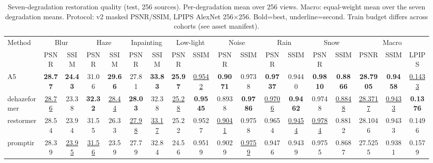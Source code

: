 \begin{table}[t]
\centering
\caption{Seven-degradation restoration quality (test, 256 sources). Per-degradation mean over 256 views. Macro: equal-weight mean over the seven degradation means. Protocol: v2 masked PSNR/SSIM, LPIPS AlexNet 256$\times$256. Bold=best, underline=second. Train budget differs across cohorts (see asset manifest).}
\begin{tabular}{lccccccccccccccccc}
\toprule
Method & \multicolumn{2}{c}{Blur} & \multicolumn{2}{c}{Haze} & \multicolumn{2}{c}{Inpainting} & \multicolumn{2}{c}{Low-light} & \multicolumn{2}{c}{Noise} & \multicolumn{2}{c}{Rain} & \multicolumn{2}{c}{Snow} & \multicolumn{3}{c}{Macro} \\
 & PSNR & SSIM & PSNR & SSIM & PSNR & SSIM & PSNR & SSIM & PSNR & SSIM & PSNR & SSIM & PSNR & SSIM & PSNR & SSIM & LPIPS \\
\midrule
A5 & \textbf{28.77} & \textbf{24.43} & 31.06 & \textbf{29.66} & 27.81 & \textbf{33.83} & \textbf{25.97} & \underline{0.9542} & \textbf{0.9071} & 0.9738 & \textbf{0.9737} & 0.9440 & \textbf{0.9810} & \textbf{0.8866} & \textbf{28.7905} & \textbf{0.9458} & \underline{0.1433} \\
dehazeformer & \underline{28.76} & 23.38 & \textbf{32.32} & \underline{28.44} & \textbf{28.03} & 32.38 & \underline{25.28} & \textbf{0.9545} & 0.8938 & \textbf{0.9786} & \underline{0.9706} & \textbf{0.9462} & 0.9748 & \underline{0.8848} & \underline{28.3717} & \underline{0.9433} & \textbf{0.1376} \\
restormer & 28.54 & 23.94 & 31.55 & 26.33 & \underline{27.98} & \underline{33.17} & 25.22 & 0.9527 & \underline{0.9041} & 0.9758 & 0.9654 & \underline{0.9454} & \underline{0.9784} & 0.8812 & 28.1046 & 0.9433 & 0.1496 \\
promptir & 28.39 & \underline{23.95} & \underline{31.56} & 23.59 & 27.79 & 32.84 & 24.56 & 0.9519 & 0.9029 & \underline{0.9759} & 0.9476 & 0.9439 & 0.9755 & 0.8687 & 27.5255 & 0.9381 & 0.1579 \\
\bottomrule
\end{tabular}
\end{table}
